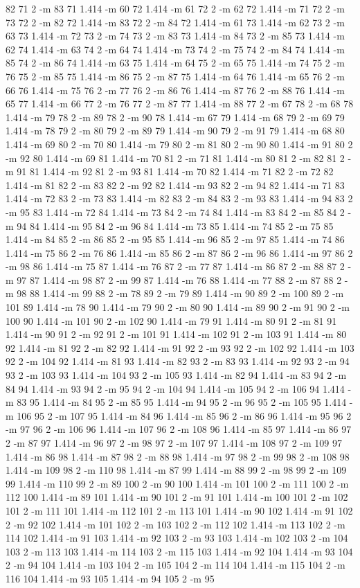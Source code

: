 \documentclass[12pt]{article}
\begin{document}
82 71 2 -m 83 71 1.414 -m 60 72 1.414 -m 61 72 2 -m 62 72 1.414 -m 71 72 2 -m 73 72 2 -m 82 72 1.414 -m 83 72 2 -m 84 72 1.414 -m 61 73 1.414 -m 62 73 2 -m 63 73 1.414 -m 72 73 2 -m 74 73 2 -m 83 73 1.414 -m 84 73 2 -m 85 73 1.414 -m 62 74 1.414 -m 63 74 2 -m 64 74 1.414 -m 73 74 2 -m 75 74 2 -m 84 74 1.414 -m 85 74 2 -m 86 74 1.414 -m 63 75 1.414 -m 64 75 2 -m 65 75 1.414 -m 74 75 2 -m 76 75 2 -m 85 75 1.414 -m 86 75 2 -m 87 75 1.414 -m 64 76 1.414 -m 65 76 2 -m 66 76 1.414 -m 75 76 2 -m 77 76 2 -m 86 76 1.414 -m 87 76 2 -m 88 76 1.414 -m 65 77 1.414 -m 66 77 2 -m 76 77 2 -m 87 77 1.414 -m 88 77 2 -m 67 78 2 -m 68 78 1.414 -m 79 78 2 -m 89 78 2 -m 90 78 1.414 -m 67 79 1.414 -m 68 79 2 -m 69 79 1.414 -m 78 79 2 -m 80 79 2 -m 89 79 1.414 -m 90 79 2 -m 91 79 1.414 -m 68 80 1.414 -m 69 80 2 -m 70 80 1.414 -m 79 80 2 -m 81 80 2 -m 90 80 1.414 -m 91 80 2 -m 92 80 1.414 -m 69 81 1.414 -m 70 81 2 -m 71 81 1.414 -m 80 81 2 -m 82 81 2 -m 91 81 1.414 -m 92 81 2 -m 93 81 1.414 -m 70 82 1.414 -m 71 82 2 -m 72 82 1.414 -m 81 82 2 -m 83 82 2 -m 92 82 1.414 -m 93 82 2 -m 94 82 1.414 -m 71 83 1.414 -m 72 83 2 -m 73 83 1.414 -m 82 83 2 -m 84 83 2 -m 93 83 1.414 -m 94 83 2 -m 95 83 1.414 -m 72 84 1.414 -m 73 84 2 -m 74 84 1.414 -m 83 84 2 -m 85 84 2 -m 94 84 1.414 -m 95 84 2 -m 96 84 1.414 -m 73 85 1.414 -m 74 85 2 -m 75 85 1.414 -m 84 85 2 -m 86 85 2 -m 95 85 1.414 -m 96 85 2 -m 97 85 1.414 -m 74 86 1.414 -m 75 86 2 -m 76 86 1.414 -m 85 86 2 -m 87 86 2 -m 96 86 1.414 -m 97 86 2 -m 98 86 1.414 -m 75 87 1.414 -m 76 87 2 -m 77 87 1.414 -m 86 87 2 -m 88 87 2 -m 97 87 1.414 -m 98 87 2 -m 99 87 1.414 -m 76 88 1.414 -m 77 88 2 -m 87 88 2 -m 98 88 1.414 -m 99 88 2 -m 78 89 2 -m 79 89 1.414 -m 90 89 2 -m 100 89 2 -m 101 89 1.414 -m 78 90 1.414 -m 79 90 2 -m 80 90 1.414 -m 89 90 2 -m 91 90 2 -m 100 90 1.414 -m 101 90 2 -m 102 90 1.414 -m 79 91 1.414 -m 80 91 2 -m 81 91 1.414 -m 90 91 2 -m 92 91 2 -m 101 91 1.414 -m 102 91 2 -m 103 91 1.414 -m 80 92 1.414 -m 81 92 2 -m 82 92 1.414 -m 91 92 2 -m 93 92 2 -m 102 92 1.414 -m 103 92 2 -m 104 92 1.414 -m 81 93 1.414 -m 82 93 2 -m 83 93 1.414 -m 92 93 2 -m 94 93 2 -m 103 93 1.414 -m 104 93 2 -m 105 93 1.414 -m 82 94 1.414 -m 83 94 2 -m 84 94 1.414 -m 93 94 2 -m 95 94 2 -m 104 94 1.414 -m 105 94 2 -m 106 94 1.414 -m 83 95 1.414 -m 84 95 2 -m 85 95 1.414 -m 94 95 2 -m 96 95 2 -m 105 95 1.414 -m 106 95 2 -m 107 95 1.414 -m 84 96 1.414 -m 85 96 2 -m 86 96 1.414 -m 95 96 2 -m 97 96 2 -m 106 96 1.414 -m 107 96 2 -m 108 96 1.414 -m 85 97 1.414 -m 86 97 2 -m 87 97 1.414 -m 96 97 2 -m 98 97 2 -m 107 97 1.414 -m 108 97 2 -m 109 97 1.414 -m 86 98 1.414 -m 87 98 2 -m 88 98 1.414 -m 97 98 2 -m 99 98 2 -m 108 98 1.414 -m 109 98 2 -m 110 98 1.414 -m 87 99 1.414 -m 88 99 2 -m 98 99 2 -m 109 99 1.414 -m 110 99 2 -m 89 100 2 -m 90 100 1.414 -m 101 100 2 -m 111 100 2 -m 112 100 1.414 -m 89 101 1.414 -m 90 101 2 -m 91 101 1.414 -m 100 101 2 -m 102 101 2 -m 111 101 1.414 -m 112 101 2 -m 113 101 1.414 -m 90 102 1.414 -m 91 102 2 -m 92 102 1.414 -m 101 102 2 -m 103 102 2 -m 112 102 1.414 -m 113 102 2 -m 114 102 1.414 -m 91 103 1.414 -m 92 103 2 -m 93 103 1.414 -m 102 103 2 -m 104 103 2 -m 113 103 1.414 -m 114 103 2 -m 115 103 1.414 -m 92 104 1.414 -m 93 104 2 -m 94 104 1.414 -m 103 104 2 -m 105 104 2 -m 114 104 1.414 -m 115 104 2 -m 116 104 1.414 -m 93 105 1.414 -m 94 105 2 -m 95 
\end{document}
